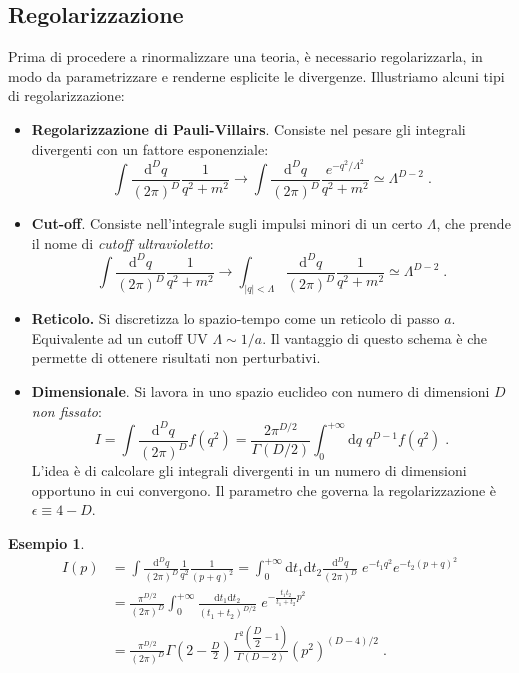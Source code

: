 \documentclass[12pt,a4paper]{article}
\theoremstyle{definition}
\newtheorem{exm}{Esempio}
\numberwithin{equation}{section}
\newcommand{\diff}[1][]{\mathrm{d}#1}
\begin{document}
\subsection{Regolarizzazione}
Prima di procedere a rinormalizzare una teoria, è necessario regolarizzarla, in modo da parametrizzare e renderne esplicite le divergenze. Illustriamo alcuni tipi di regolarizzazione:
\begin{itemize}
\item \textbf{Regolarizzazione di Pauli-Villairs}. Consiste nel pesare gli integrali divergenti con un fattore esponenziale:
\begin{equation}
\int\frac{\diff^D{q}}{(2\pi)^D}\frac{1}{q^2+m^2}\longrightarrow \int\frac{\diff^D{q}}{(2\pi)^D}\frac{e^{-q^2/\Lambda^2}}{q^2+m^2}\simeq \Lambda^{D-2}\;.
\end{equation}
\item \textbf{Cut-off}. Consiste nell'integrale sugli impulsi minori di un certo $\Lambda$, che prende il nome di \emph{cutoff ultravioletto}:
\begin{equation}
\int\frac{\diff^D{q}}{(2\pi)^D}\frac{1}{q^2+m^2}\longrightarrow \int_{|q|<\Lambda}\frac{\diff^D{q}}{(2\pi)^D}\frac{1}{q^2+m^2}\simeq \Lambda^{D-2}\;.
\end{equation}
\item \textbf{Reticolo.} Si discretizza lo spazio-tempo come un reticolo di passo $a$. Equivalente ad un cutoff UV $\Lambda\sim 1/a$. Il vantaggio di questo schema è che permette di ottenere risultati non perturbativi.
\item \textbf{Dimensionale}. Si lavora in uno spazio euclideo con numero di dimensioni $D$ \emph{non fissato}:
\begin{equation}
I=\int\frac{\diff^D{q}}{(2\pi)^D}f(q^2)=\frac{2\pi^{D/2}}{\Gamma(D/2)}\int_0^{+\infty}\diff{q}\;q^{D-1}f(q^2)\;.
\end{equation}
L'idea è di calcolare gli integrali divergenti in un numero di dimensioni opportuno in cui convergono. Il parametro che governa la regolarizzazione è $\epsilon\equiv 4-D$.
\end{itemize}
\begin{exm} 
\begin{align*}
I(p) &= \int\frac{\diff^D{q}}{(2\pi)^D}\frac{1}{q^2}\frac{1}{(p+q)^2}=\int_0^{+\infty}\diff{t_1}\diff{t_2}\frac{\diff^D{q}}{(2\pi)^D}\;e^{-t_1q^2}e^{-t_2(p+q)^2} \\
&=\frac{\pi^{D/2}}{(2\pi)^D}\int_0^{+\infty}\frac{\diff{t_1}\diff{t_2}}{(t_1+t_2)^{D/2}}\;e^{-\frac{t_1t_2}{t_1+t_2}p^2} \\
&=\frac{\pi^{D/2}}{(2\pi)^D}\Gamma\left(2-\frac{D}{2}\right)\frac{\Gamma^2\left(\dfrac{D}{2}-1\right)}{\Gamma(D-2)}(p^2)^{(D-4)/2}\;.
\end{align*}
\end{exm}
\end{document}
